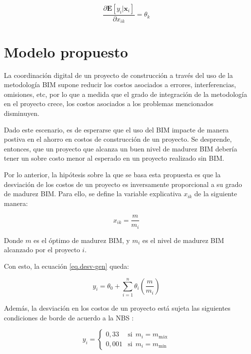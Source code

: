\begin{equation}
    \label{eq.efec_marginal}
    \frac{\partial \bm{E}[y_i|\bm{x}_i]}{\partial x_{ik}} =\theta_k
\end{equation}

\section{Modelo propuesto}

La coordinación digital de un proyecto de construcción a través del uso de la metodología BIM supone reducir los costos asociados a errores, interferencias, omisiones, etc, por lo que a medida que el grado de integración de la metodología en el proyecto crece, los costos asociados a los problemas mencionados disminuyen.

Dado este escenario, es de esperarse que el uso del BIM impacte de manera postiva en el ahorro en costos de construcción de un proyecto. Se desprende, entonces, que un proyecto que alcanza un buen nivel de madurez BIM debería tener un sobre costo menor al esperado en un proyecto realizado sin BIM.

Por lo anterior, la hipótesis sobre la que se basa esta propuesta es que la desviación de los costos de un proyecto es inversamente proporcional a su grado de madurez BIM. Para ello, se define la variable explicativa $x_{ik}$ de la siguiente manera:

\begin{equation}
    x_{ik} = \frac{m}{m_i}
\end{equation}

Donde $m$ es el óptimo de madurez BIM, y $m_i$ es el nivel de madurez BIM alcanzado por el proyecto $i$. 

Con esto, la ecuación \eqref{eq.desv-gen} queda:

\begin{equation}
    y_i = \theta_0 + \sum\limits_{i=1}^n \theta_i \left(\frac{m}{m_i} \right)
\end{equation}

Además, la desviación en los costos de un proyecto está sujeta las siguientes condiciones de borde de acuerdo a la NBS \cite{nbs}:

\begin{equation}
    y_i = 
    \begin{cases}
        0,33 & \text{si}~~ m_i = m_{\text{máx}} \\
        0,001 & \text{si}~~ m_i = m_{\text{mín}}
    \end{cases}
\end{equation}

